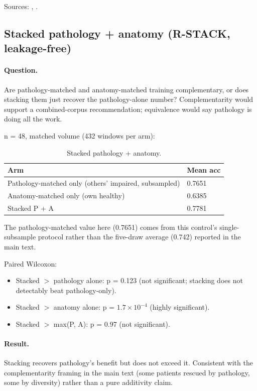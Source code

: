 \documentclass{article}
\begin{document}
Sources: , .

\subsection{Stacked pathology + anatomy (R-STACK, leakage-free)}
\label{app:stack}

\paragraph{Question.} Are pathology-matched and anatomy-matched training complementary, or does stacking them just recover the pathology-alone number? Complementarity would support a combined-corpus recommendation; equivalence would say pathology is doing all the work.

n = 48, matched volume (432 windows per arm):

\begin{table}[h]
  \caption{Stacked pathology + anatomy.}
  \label{tab:stack}
  \centering
  \small
  \begin{tabular}{ll}
    \toprule
    Arm & Mean acc \\
    \midrule
    Pathology-matched only (others' impaired, subsampled) & 0.7651 \\
    Anatomy-matched only (own healthy) & 0.6385 \\
    Stacked P + A & 0.7781 \\
    \bottomrule
  \end{tabular}
\end{table}

The pathology-matched value here (0.7651) comes from this control's single-subsample protocol rather than the five-draw average (0.742) reported in the main text.

Paired Wilcoxon:
\begin{itemize}
  \item Stacked $>$ pathology alone: p = 0.123 (not significant; stacking does not detectably beat pathology-only).
  \item Stacked $>$ anatomy alone: p = $1.7 \times 10^{-4}$ (highly significant).
  \item Stacked $>$ max(P, A): p = 0.97 (not significant).
\end{itemize}

\paragraph{Result.} Stacking recovers pathology's benefit but does not exceed it. Consistent with the complementarity framing in the main text (some patients rescued by pathology, some by diversity) rather than a pure additivity claim.
\end{document}
